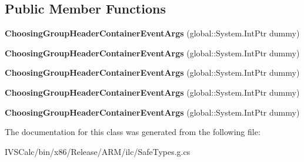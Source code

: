 \subsection*{Public Member Functions}
\begin{DoxyCompactItemize}
\item 
\mbox{\label{class_windows_1_1_u_i_1_1_xaml_1_1_controls_1_1_choosing_group_header_container_event_args_a68570fa44c93116eaf939a2c8a65a894}} 
{\bfseries Choosing\+Group\+Header\+Container\+Event\+Args} (global\+::\+System.\+Int\+Ptr dummy)
\item 
\mbox{\label{class_windows_1_1_u_i_1_1_xaml_1_1_controls_1_1_choosing_group_header_container_event_args_a68570fa44c93116eaf939a2c8a65a894}} 
{\bfseries Choosing\+Group\+Header\+Container\+Event\+Args} (global\+::\+System.\+Int\+Ptr dummy)
\item 
\mbox{\label{class_windows_1_1_u_i_1_1_xaml_1_1_controls_1_1_choosing_group_header_container_event_args_a68570fa44c93116eaf939a2c8a65a894}} 
{\bfseries Choosing\+Group\+Header\+Container\+Event\+Args} (global\+::\+System.\+Int\+Ptr dummy)
\item 
\mbox{\label{class_windows_1_1_u_i_1_1_xaml_1_1_controls_1_1_choosing_group_header_container_event_args_a68570fa44c93116eaf939a2c8a65a894}} 
{\bfseries Choosing\+Group\+Header\+Container\+Event\+Args} (global\+::\+System.\+Int\+Ptr dummy)
\item 
\mbox{\label{class_windows_1_1_u_i_1_1_xaml_1_1_controls_1_1_choosing_group_header_container_event_args_a68570fa44c93116eaf939a2c8a65a894}} 
{\bfseries Choosing\+Group\+Header\+Container\+Event\+Args} (global\+::\+System.\+Int\+Ptr dummy)
\end{DoxyCompactItemize}


The documentation for this class was generated from the following file\+:\begin{DoxyCompactItemize}
\item 
I\+V\+S\+Calc/bin/x86/\+Release/\+A\+R\+M/ilc/Safe\+Types.\+g.\+cs\end{DoxyCompactItemize}
